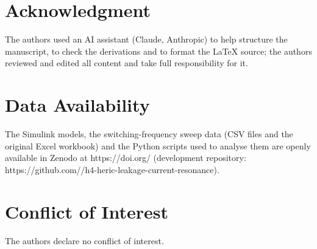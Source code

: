 \section*{Acknowledgment}
 The authors used an AI assistant (Claude, Anthropic) to help structure the manuscript, to check the derivations and to format the \LaTeX{} source; the authors reviewed and edited all content and take full responsibility for it. 

\section*{Data Availability}
The Simulink models, the switching-frequency sweep data (CSV files and the original Excel workbook) and the Python scripts used to analyse them are openly available in Zenodo at https://doi.org/ (development repository: https://github.com//h4-heric-leakage-current-resonance).

\section*{Conflict of Interest}
The authors declare no conflict of interest. 
